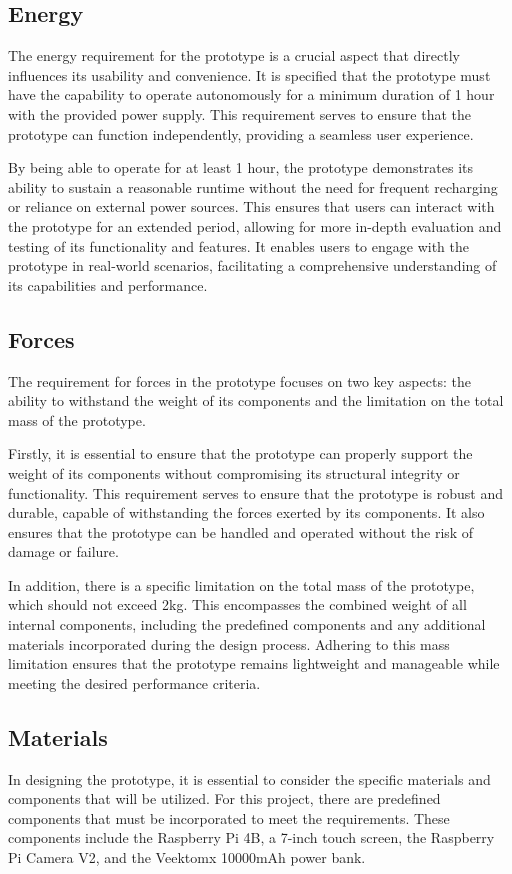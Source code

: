 \subsection{Energy}
The energy requirement for the prototype is a crucial aspect that directly influences its usability and convenience. It is specified that the prototype must have the capability to operate autonomously for a minimum duration of 1 hour with the provided power supply. This requirement serves to ensure that the prototype can function independently, providing a seamless user experience.

By being able to operate for at least 1 hour, the prototype demonstrates its ability to sustain a reasonable runtime without the need for frequent recharging or reliance on external power sources. This ensures that users can interact with the prototype for an extended period, allowing for more in-depth evaluation and testing of its functionality and features. It enables users to engage with the prototype in real-world scenarios, facilitating a comprehensive understanding of its capabilities and performance.

\subsection{Forces}
The requirement for forces in the prototype focuses on two key aspects: the ability to withstand the weight of its components and the limitation on the total mass of the prototype.

Firstly, it is essential to ensure that the prototype can properly support the weight of its components without compromising its structural integrity or functionality. This requirement serves to ensure that the prototype is robust and durable, capable of withstanding the forces exerted by its components. It also ensures that the prototype can be handled and operated without the risk of damage or failure.

In addition, there is a specific limitation on the total mass of the prototype, which should not exceed 2kg. This encompasses the combined weight of all internal components, including the predefined components and any additional materials incorporated during the design process. Adhering to this mass limitation ensures that the prototype remains lightweight and manageable while meeting the desired performance criteria.

\subsection{Materials}
In designing the prototype, it is essential to consider the specific materials and components that will be utilized. For this project, there are predefined components that must be incorporated to meet the requirements. These components include the Raspberry Pi 4B, a 7-inch touch screen, the Raspberry Pi Camera V2, and the Veektomx 10000mAh power bank.

